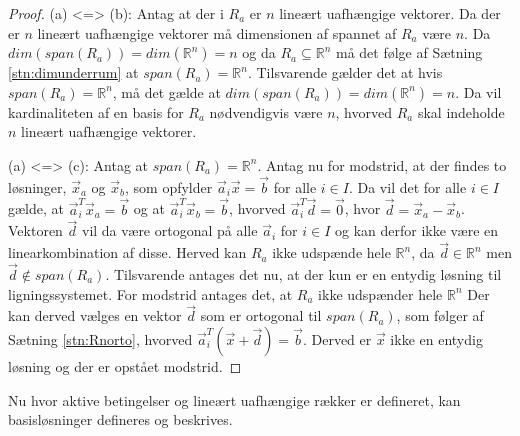\begin{proof}
	(a) <=> (b): Antag at der i $R_a$ er $n$ lineært uafhængige vektorer. 
	Da der er $n$ lineært uafhængige vektorer må dimensionen af spannet af $R_a$ være $n$. 
	Da $dim(span(R_a))=dim(\mathds{R}^n)=n$ og da $R_a \subseteq \mathds{R}^n$ må det følge af Sætning \ref{stn:dimunderrum} at $span(R_a)=\mathds{R}^n$. 
	Tilsvarende gælder det at hvis $span(R_a)=\mathds{R}^n$, må det gælde at $dim(span(R_a))=dim(\mathds{R}^n)=n$. 
	Da vil kardinaliteten af en basis for $R_a$ nødvendigvis være $n$, hvorved $R_a$ skal indeholde $n$ lineært uafhængige vektorer.


(a) <=> (c): Antag at $span(R_a)=\mathds{R}^n$. Antag nu for modstrid, at der findes to løsninger, $\vec{x}_a$ og $\vec{x}_b$, som opfylder $\vec{a}_i\vec{x}=\vec{b}$ for alle $i \in I$. 
Da vil det for alle $i \in I$ gælde, at $\vec{a}_i^T\vec{x}_a=\vec{b}$ og at $\vec{a}_i^T\vec{x}_b=\vec{b}$, hvorved $\vec{a}_i^T\vec{d}=\vec{0}$, hvor $\vec{d}=\vec{x}_a-\vec{x}_b$. 
Vektoren $\vec{d}$ vil da være ortogonal på alle $\vec{a}_i$ for $i \in I$ og kan derfor ikke være en linearkombination af disse. 
Herved kan $R_a$ ikke udspænde hele $\mathds{R}^n$, da $\vec{d} \in \mathds{R}^n$ men $\vec{d} \notin span(R_a)$.
Tilsvarende antages det nu, at der kun er en entydig løsning til ligningssystemet. 
For modstrid antages det, at $R_a$ ikke udspænder hele $\mathds{R}^n$ Der kan derved vælges en vektor $\vec{d}$ som er ortogonal til $span(R_a)$, som følger af Sætning \ref{stn:Rnorto}, hvorved $\vec{a}_i^T(\vec{x}+\vec{d})=\vec{b}$. 
Derved er $\vec{x}$ ikke en entydig løsning og der er opstået modstrid.
\end{proof}
	
Nu hvor aktive betingelser og lineært uafhængige rækker er defineret, kan basisløsninger defineres og beskrives.

